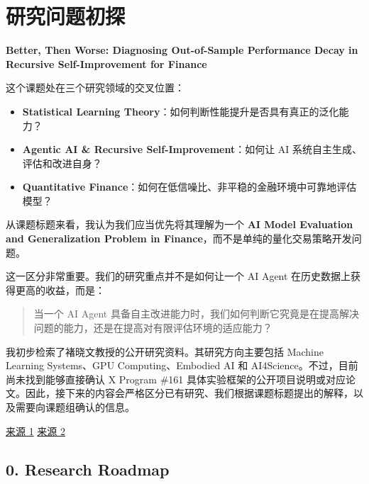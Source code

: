 \hypertarget{part-1-03-0001-ux7814ux7a76ux95eeux9898ux521dux63a2}{%
\section{研究问题初探}\label{part-1-03-0001-ux7814ux7a76ux95eeux9898ux521dux63a2}}

\textbf{Better, Then Worse: Diagnosing Out-of-Sample Performance Decay in Recursive Self-Improvement for Finance}

这个课题处在三个研究领域的交叉位置：

\begin{itemize}
\tightlist
\item
  \textbf{Statistical Learning Theory}：如何判断性能提升是否具有真正的泛化能力？
\item
  \textbf{Agentic AI \& Recursive Self-Improvement}：如何让 AI 系统自主生成、评估和改进自身？
\item
  \textbf{Quantitative Finance}：如何在低信噪比、非平稳的金融环境中可靠地评估模型？
\end{itemize}

从课题标题来看，我认为我们应当优先将其理解为一个 \textbf{AI Model Evaluation and Generalization Problem in Finance}，而不是单纯的量化交易策略开发问题。

这一区分非常重要。我们的研究重点并不是如何让一个 AI Agent 在历史数据上获得更高的收益，而是：

\begin{quote}
当一个 AI Agent 具备自主改进能力时，我们如何判断它究竟是在提高解决问题的能力，还是在提高对有限评估环境的适应能力？
\end{quote}

我初步检索了褚晓文教授的公开研究资料。其研究方向主要包括 Machine Learning Systems、GPU Computing、Embodied AI 和 AI4Science。不过，目前尚未找到能够直接确认 X Program \#161 具体实验框架的公开项目说明或对应论文。因此，接下来的内容会严格区分已有研究、我们根据课题标题提出的解释，以及需要向课题组确认的信息。

\href{https://sites.google.com/view/chuxiaowen}{来源 1} \href{https://mbaplus.hkust-gz.edu.cn/zh/2026/11/02/xiaowen-chu/}{来源 2}

\hypertarget{part-1-03-0001-research-roadmap}{%
\subsection{0. Research Roadmap}\label{part-1-03-0001-research-roadmap}}

